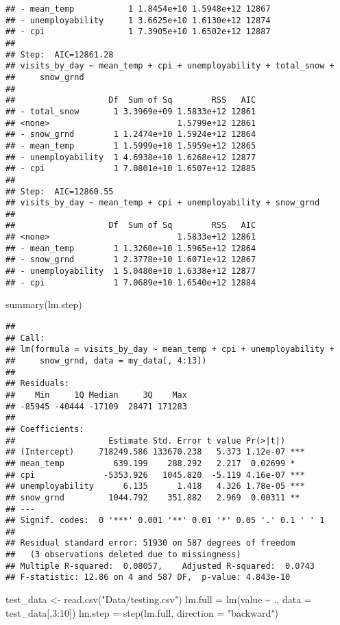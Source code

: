 \documentclass[
]{article}
\newenvironment{Shaded}{\begin{snugshade}}{\end{snugshade}}
\newcommand{\AttributeTok}[1]{\textcolor[rgb]{0.77,0.63,0.00}{#1}}
\newcommand{\DecValTok}[1]{\textcolor[rgb]{0.00,0.00,0.81}{#1}}
\newcommand{\FunctionTok}[1]{\textcolor[rgb]{0.00,0.00,0.00}{#1}}
\newcommand{\NormalTok}[1]{#1}
\newcommand{\OtherTok}[1]{\textcolor[rgb]{0.56,0.35,0.01}{#1}}
\newcommand{\SpecialCharTok}[1]{\textcolor[rgb]{0.00,0.00,0.00}{#1}}
\newcommand{\StringTok}[1]{\textcolor[rgb]{0.31,0.60,0.02}{#1}}
\begin{document}
\begin{verbatim}
## - mean_temp           1 1.8454e+10 1.5948e+12 12867
## - unemployability     1 3.6625e+10 1.6130e+12 12874
## - cpi                 1 7.3905e+10 1.6502e+12 12887
## 
## Step:  AIC=12861.28
## visits_by_day ~ mean_temp + cpi + unemployability + total_snow + 
##     snow_grnd
## 
##                   Df  Sum of Sq        RSS   AIC
## - total_snow       1 3.3969e+09 1.5833e+12 12861
## <none>                          1.5799e+12 12861
## - snow_grnd        1 1.2474e+10 1.5924e+12 12864
## - mean_temp        1 1.5999e+10 1.5959e+12 12865
## - unemployability  1 4.6938e+10 1.6268e+12 12877
## - cpi              1 7.0801e+10 1.6507e+12 12885
## 
## Step:  AIC=12860.55
## visits_by_day ~ mean_temp + cpi + unemployability + snow_grnd
## 
##                   Df  Sum of Sq        RSS   AIC
## <none>                          1.5833e+12 12861
## - mean_temp        1 1.3260e+10 1.5965e+12 12864
## - snow_grnd        1 2.3778e+10 1.6071e+12 12867
## - unemployability  1 5.0480e+10 1.6338e+12 12877
## - cpi              1 7.0689e+10 1.6540e+12 12884
\end{verbatim}

\begin{Shaded}
\begin{Highlighting}[]
\FunctionTok{summary}\NormalTok{(lm.step)}
\end{Highlighting}
\end{Shaded}

\begin{verbatim}
## 
## Call:
## lm(formula = visits_by_day ~ mean_temp + cpi + unemployability + 
##     snow_grnd, data = my_data[, 4:13])
## 
## Residuals:
##    Min     1Q Median     3Q    Max 
## -85945 -40444 -17109  28471 171283 
## 
## Coefficients:
##                   Estimate Std. Error t value Pr(>|t|)    
## (Intercept)     718249.586 133670.238   5.373 1.12e-07 ***
## mean_temp          639.199    288.292   2.217  0.02699 *  
## cpi              -5353.926   1045.820  -5.119 4.16e-07 ***
## unemployability      6.135      1.418   4.326 1.78e-05 ***
## snow_grnd         1044.792    351.882   2.969  0.00311 ** 
## ---
## Signif. codes:  0 '***' 0.001 '**' 0.01 '*' 0.05 '.' 0.1 ' ' 1
## 
## Residual standard error: 51930 on 587 degrees of freedom
##   (3 observations deleted due to missingness)
## Multiple R-squared:  0.08057,    Adjusted R-squared:  0.0743 
## F-statistic: 12.86 on 4 and 587 DF,  p-value: 4.843e-10
\end{verbatim}

\begin{Shaded}
\begin{Highlighting}[]
\NormalTok{test\_data }\OtherTok{\textless{}{-}} \FunctionTok{read.csv}\NormalTok{(}\StringTok{"Data/testing.csv"}\NormalTok{)}
\NormalTok{lm.full }\OtherTok{=} \FunctionTok{lm}\NormalTok{(value }\SpecialCharTok{\textasciitilde{}}\NormalTok{ ., }\AttributeTok{data =}\NormalTok{ test\_data[,}\DecValTok{3}\SpecialCharTok{:}\DecValTok{10}\NormalTok{])}
\NormalTok{lm.step }\OtherTok{=} \FunctionTok{step}\NormalTok{(lm.full, }\AttributeTok{direction =} \StringTok{"backward"}\NormalTok{)}
\end{Highlighting}
\end{Shaded}
\end{document}

